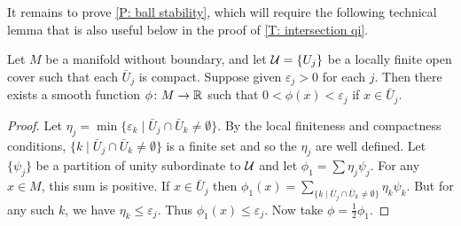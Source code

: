 	\begin{comment}
			For injectivity, suppose $W \in PC^*_{\Gamma \pf X}(M)$ is transverse to the cubulation and represents zero in $H^*(C_\Gamma^*(M))$.
			Then by definition there is a $V \in PC^*_\Gamma(M)$ with $\bd V = W+T$ for some
			$T \in Q^*(M)$.
			By \cref{P: ball stability} there is a proper universal homotopy $h \colon V \times I \to M$ such that $h(-,1)$ and $h \circ (i_{W} \times \id)$ are both transverse to the cubulation.
			Let $V', W',T' \in PC^*_\Gamma(M)$ be $W$, $V$, and $T$ but with reference maps given respectively by $h(-,1)$, $h(-,1)i_W$, and $h(-,1)i_T$, where $i_W \colon W \to V$ and $i_T \colon T \to V$ are the boundary inclusion maps restricted to the components of $W$ and $T$, respectively.
			As $h \circ (i_{W} \times \id)$ is transverse to the cubulation, $W$ and $W'$ represent the same element of $H^*_{\Gamma \pf X}(M)$ by arguments analogous to the proof of \cref{C: homotopy}.
			But we also have $\bd V' = W'+T'$ with $V'$ in $C^*_{\Gamma \pf X}(M)$ and, by \cref{L: Q preservation}, $T' \in Q^*(M)$.
			So $W'$ represents $0 \in H^*(C^*_{\Gamma \pf X}(M))$.
	\end{comment}


It remains to prove \cref{P: ball stability}, which will require the following technical lemma that is also useful below in the proof of \cref{T: intersection qi}.

\begin{lemma}\label{L: minimizer}
	Let $M$ be a manifold without boundary, and let $\mathcal{U} = \{U_j\}$ be a locally finite open cover such that each $\bar U_j$ is compact.
	Suppose given $\varepsilon_j>0$ for each $j$.
	Then there exists a smooth function $\phi \colon M \to \mathbb{R}$ such that $0<\phi(x)<\varepsilon_j$ if $x \in \bar U_j$.
\end{lemma}

\begin{proof}
	Let $\eta_j = \min\{\varepsilon_k \mid \bar U_j \cap \bar U_k\neq \emptyset\}$.
	By the local finiteness and compactness conditions, $\{k \mid \bar U_j \cap \bar U_k\neq \emptyset\}$ is a finite set and so the $\eta_j$ are well defined.
	Let $\{\psi_j\}$ be a partition of unity subordinate to $\mathcal{U}$ and let $\phi_1 = \sum \eta_j\psi_j$.
	For any $x \in M$, this sum is positive.
	If $x \in \bar U_j$ then $\phi_1(x) = \sum_{\{k \mid \bar U_j \cap \bar U_k\neq \emptyset\}} \eta_k\psi_k$.
	But for any such $k$, we have $\eta_k \leq \varepsilon_j$.
	Thus $\phi_1(x) \leq \varepsilon_j$.
	Now take $\phi = \frac{1}{2}\phi_1$.
\end{proof}

